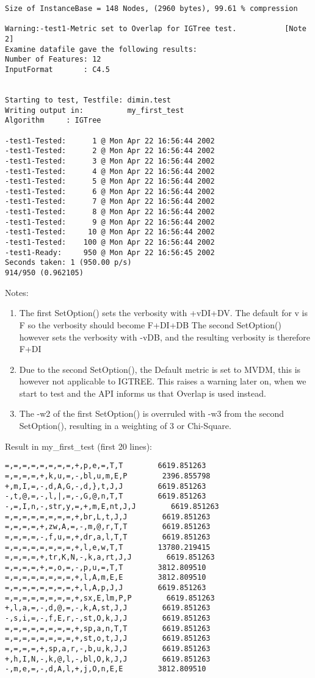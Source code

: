 \documentclass{article}
\begin{document}
\begin{verbatim}
Size of InstanceBase = 148 Nodes, (2960 bytes), 99.61 % compression

Warning:-test1-Metric set to Overlap for IGTree test.           [Note 2]
Examine datafile gave the following results:
Number of Features: 12
InputFormat       : C4.5


Starting to test, Testfile: dimin.test
Writing output in:          my_first_test
Algorithm     : IGTree

-test1-Tested:      1 @ Mon Apr 22 16:56:44 2002
-test1-Tested:      2 @ Mon Apr 22 16:56:44 2002
-test1-Tested:      3 @ Mon Apr 22 16:56:44 2002
-test1-Tested:      4 @ Mon Apr 22 16:56:44 2002
-test1-Tested:      5 @ Mon Apr 22 16:56:44 2002
-test1-Tested:      6 @ Mon Apr 22 16:56:44 2002
-test1-Tested:      7 @ Mon Apr 22 16:56:44 2002
-test1-Tested:      8 @ Mon Apr 22 16:56:44 2002
-test1-Tested:      9 @ Mon Apr 22 16:56:44 2002
-test1-Tested:     10 @ Mon Apr 22 16:56:44 2002
-test1-Tested:    100 @ Mon Apr 22 16:56:44 2002
-test1-Ready:     950 @ Mon Apr 22 16:56:45 2002
Seconds taken: 1 (950.00 p/s)
914/950 (0.962105)

\end{verbatim}

Notes:
\begin{enumerate}
\item The first SetOption() sets the verbosity with +vDI+DV.
The default for v is F so the verbosity should become F+DI+DB
The second SetOption() however sets the verbosity with -vDB, and the
resulting verbosity is therefore F+DI
\item Due to the second SetOption(), the Default metric is set to
MVDM, this is however not applicable to IGTREE. This raises a warning
later on, when we start to test and the API informs us that Overlap is
used instead.
\item The -w2 of the first SetOption() is overruled with -w3 from the
second SetOption(), resulting in a weighting of 3 or Chi-Square.
\end{enumerate}

Result in my\_first\_test (first 20 lines):
\begin{verbatim}
=,=,=,=,=,=,=,=,+,p,e,=,T,T        6619.851263
=,=,=,=,+,k,u,=,-,bl,u,m,E,P        2396.855798
+,m,I,=,-,d,A,G,-,d,},t,J,J        6619.851263
-,t,@,=,-,l,|,=,-,G,@,n,T,T        6619.851263
-,=,I,n,-,str,y,=,+,m,E,nt,J,J        6619.851263
=,=,=,=,=,=,=,=,+,br,L,t,J,J        6619.851263
=,=,=,=,+,zw,A,=,-,m,@,r,T,T        6619.851263
=,=,=,=,-,f,u,=,+,dr,a,l,T,T        6619.851263
=,=,=,=,=,=,=,=,+,l,e,w,T,T        13780.219415
=,=,=,=,+,tr,K,N,-,k,a,rt,J,J        6619.851263
=,=,=,=,+,=,o,=,-,p,u,=,T,T        3812.809510
=,=,=,=,=,=,=,=,+,l,A,m,E,E        3812.809510
=,=,=,=,=,=,=,=,+,l,A,p,J,J        6619.851263
=,=,=,=,=,=,=,=,+,sx,E,lm,P,P        6619.851263
+,l,a,=,-,d,@,=,-,k,A,st,J,J        6619.851263
-,s,i,=,-,f,E,r,-,st,O,k,J,J        6619.851263
=,=,=,=,=,=,=,=,+,sp,a,n,T,T        6619.851263
=,=,=,=,=,=,=,=,+,st,o,t,J,J        6619.851263
=,=,=,=,+,sp,a,r,-,b,u,k,J,J        6619.851263
+,h,I,N,-,k,@,l,-,bl,O,k,J,J        6619.851263
-,m,e,=,-,d,A,l,+,j,O,n,E,E        3812.809510
\end{verbatim}
\end{document}
